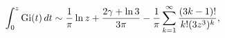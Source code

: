 \[\int_{0}^{z}\mathop{\mathrm{Gi}\/}\nolimits\!\left(t\right)dt\sim\frac{1}{\pi}%
\mathop{\ln\/}\nolimits z+\frac{2\gamma+\mathop{\ln\/}\nolimits 3}{3\pi}-\frac%
{1}{\pi}\sum_{k=1}^{\infty}\frac{(3k-1)!}{k!(3z^{3})^{k}},\]